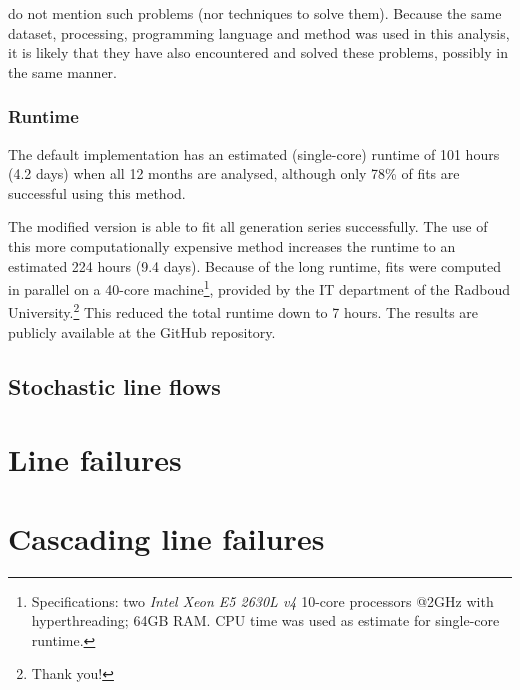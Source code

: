 \documentclass[main.tex]{subfiles}
\begin{document}
\citet{Nesti2018emergentfailures} do not mention such problems (nor techniques to solve them). Because the same dataset, processing, programming language and method was used in this analysis, it is likely that they have also encountered and solved these problems, possibly in the same manner.

\subsubsection{Runtime}
The default implementation has an estimated (single-core) runtime of 101 hours (4.2 days) when all 12 months are analysed, although only 78\% of fits are successful using this method.

The modified version is able to fit all generation series successfully. The use of this more computationally expensive method increases the runtime to an estimated 224 hours (9.4 days). Because of the long runtime, fits were computed in parallel on a 40-core machine\footnote{Specifications: two \textit{Intel Xeon E5 2630L v4} 10-core processors @2GHz with hyperthreading; 64GB RAM. CPU time was used as estimate for single-core runtime.}, provided by the IT department of the Radboud University.\footnote{Thank you!} This reduced the total runtime down to 7 hours. The results are publicly available at the GitHub repository.

\subsection{Stochastic line flows}

\section{Line failures}
\section{Cascading line failures}
\end{document}
